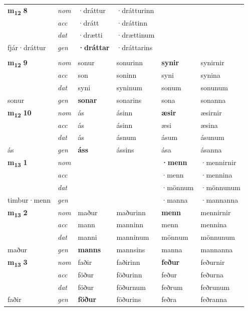 \begin{longtable}[l]{X>{\footnotesize\itshape}XXXXX}
\multirow{3}{*}{{{\textbf{m{\textsubscript{12}}} \Large{\textbf{8}}}}} & nom & ·dráttur & ·drátturinn & \textbf{} &  \\*
 & acc & ·drátt & ·dráttinn &  &  \\*
 & dat & ·drætti & ·drættinum &  &  \\*
 {\footnotesize{fjár\allowbreak ·dráttur}} & gen & \textbf{·dráttar} & ·dráttarins &  &  \\*
   & &  & &  &  \\


\multirow{3}{*}{{{\textbf{m{\textsubscript{12}}} \Large{\textbf{9}}}}} & nom & sonur & sonurinn & \textbf{synir} & synirnir \\*
 & acc & son & soninn & syni & synina \\*
 & dat & syni & syninum & sonum & sonunum \\*
 {\footnotesize{sonur}} & gen & \textbf{sonar} & sonarins & sona & sonanna \\
\cmidrule{1-6}

\multirow{3}{*}{{{\textbf{m{\textsubscript{12}}} \Large{\textbf{10}}}}} & nom & ás & ásinn & \textbf{æsir} & æsirnir \\*
 & acc & ás & ásinn & æsi & æsina \\*
 & dat & ás & ásnum & ásum & ásunum \\*
 {\footnotesize{ás}} & gen & \textbf{áss} & ássins & ása & ásanna \\
\cmidrule{1-6}

\multirow{3}{*}{{{\textbf{m{\textsubscript{13}}} \Large{\textbf{1}}}}} & nom &  &  & \textbf{·menn} & ·mennirnir \\*
 & acc &  &  & ·menn & ·mennina \\*
 & dat &  &  & ·mönnum & ·mönnunum \\*
 {\footnotesize{timbur\allowbreak ·menn}} & gen & \textbf{} &  & ·manna & ·mannanna \\
\cmidrule{1-6}

\multirow{3}{*}{{{\textbf{m{\textsubscript{13}}} \Large{\textbf{2}}}}} & nom & maður & maðurinn & \textbf{menn} & mennirnir \\*
 & acc & mann & manninn & menn & mennina \\*
 & dat & manni & manninum & mönnum & mönnunum \\*
 {\footnotesize{maður}} & gen & \textbf{manns} & mannsins & manna & mannanna \\
\cmidrule{1-6}

\multirow{3}{*}{{{\textbf{m{\textsubscript{13}}} \Large{\textbf{3}}}}} & nom & faðir & faðirinn & \textbf{feður} & feðurnir \\*
 & acc & föður & föðurinn & feður & feðurna \\*
 & dat & föður & föðurnum & feðrum & feðrunum \\*
 {\footnotesize{faðir}} & gen & \textbf{föður} & föðurins & feðra & feðranna \\
\cmidrule{1-6}


\end{longtable}
